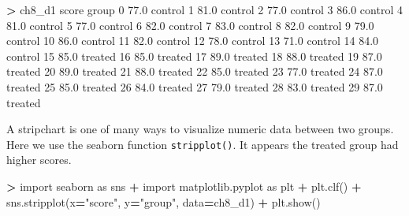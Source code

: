 \documentclass[
]{book}
\newenvironment{Shaded}{\begin{snugshade}}{\end{snugshade}}
\newcommand{\DecValTok}[1]{\textcolor[rgb]{0.00,0.00,0.81}{#1}}
\newcommand{\FloatTok}[1]{\textcolor[rgb]{0.00,0.00,0.81}{#1}}
\newcommand{\ImportTok}[1]{#1}
\newcommand{\NormalTok}[1]{#1}
\newcommand{\OperatorTok}[1]{\textcolor[rgb]{0.81,0.36,0.00}{\textbf{#1}}}
\newcommand{\StringTok}[1]{\textcolor[rgb]{0.31,0.60,0.02}{#1}}
\begin{document}
\begin{Shaded}
\begin{Highlighting}[]
\OperatorTok{\textgreater{}}\NormalTok{ ch8\_d1}
\NormalTok{    score    group}
\DecValTok{0}    \FloatTok{77.0}\NormalTok{  control}
\DecValTok{1}    \FloatTok{81.0}\NormalTok{  control}
\DecValTok{2}    \FloatTok{77.0}\NormalTok{  control}
\DecValTok{3}    \FloatTok{86.0}\NormalTok{  control}
\DecValTok{4}    \FloatTok{81.0}\NormalTok{  control}
\DecValTok{5}    \FloatTok{77.0}\NormalTok{  control}
\DecValTok{6}    \FloatTok{82.0}\NormalTok{  control}
\DecValTok{7}    \FloatTok{83.0}\NormalTok{  control}
\DecValTok{8}    \FloatTok{82.0}\NormalTok{  control}
\DecValTok{9}    \FloatTok{79.0}\NormalTok{  control}
\DecValTok{10}   \FloatTok{86.0}\NormalTok{  control}
\DecValTok{11}   \FloatTok{82.0}\NormalTok{  control}
\DecValTok{12}   \FloatTok{78.0}\NormalTok{  control}
\DecValTok{13}   \FloatTok{71.0}\NormalTok{  control}
\DecValTok{14}   \FloatTok{84.0}\NormalTok{  control}
\DecValTok{15}   \FloatTok{85.0}\NormalTok{  treated}
\DecValTok{16}   \FloatTok{85.0}\NormalTok{  treated}
\DecValTok{17}   \FloatTok{89.0}\NormalTok{  treated}
\DecValTok{18}   \FloatTok{88.0}\NormalTok{  treated}
\DecValTok{19}   \FloatTok{87.0}\NormalTok{  treated}
\DecValTok{20}   \FloatTok{89.0}\NormalTok{  treated}
\DecValTok{21}   \FloatTok{88.0}\NormalTok{  treated}
\DecValTok{22}   \FloatTok{85.0}\NormalTok{  treated}
\DecValTok{23}   \FloatTok{77.0}\NormalTok{  treated}
\DecValTok{24}   \FloatTok{87.0}\NormalTok{  treated}
\DecValTok{25}   \FloatTok{85.0}\NormalTok{  treated}
\DecValTok{26}   \FloatTok{84.0}\NormalTok{  treated}
\DecValTok{27}   \FloatTok{79.0}\NormalTok{  treated}
\DecValTok{28}   \FloatTok{83.0}\NormalTok{  treated}
\DecValTok{29}   \FloatTok{87.0}\NormalTok{  treated}
\end{Highlighting}
\end{Shaded}

A stripchart is one of many ways to visualize numeric data between two groups. Here we use the seaborn function \texttt{stripplot()}. It appears the treated group had higher scores.

\begin{Shaded}
\begin{Highlighting}[]
\OperatorTok{\textgreater{}} \ImportTok{import}\NormalTok{ seaborn }\ImportTok{as}\NormalTok{ sns}
\OperatorTok{+} \ImportTok{import}\NormalTok{ matplotlib.pyplot }\ImportTok{as}\NormalTok{ plt}
\OperatorTok{+}\NormalTok{ plt.clf()}
\OperatorTok{+}\NormalTok{ sns.stripplot(x}\OperatorTok{=}\StringTok{"score"}\NormalTok{, y}\OperatorTok{=}\StringTok{"group"}\NormalTok{, data}\OperatorTok{=}\NormalTok{ch8\_d1)}
\OperatorTok{+}\NormalTok{ plt.show()}
\end{Highlighting}
\end{Shaded}
\end{document}

